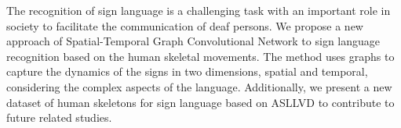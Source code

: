 The recognition of sign language is a challenging task with an important role in society to facilitate the communication of deaf persons. We propose a new approach of Spatial-Temporal Graph Convolutional Network to sign language recognition based on the human skeletal movements. The method uses graphs to capture the dynamics of the signs in two dimensions, spatial and temporal, considering the complex aspects of the language. Additionally, we present a new dataset of human skeletons for sign language based on ASLLVD to contribute to future related studies. 
